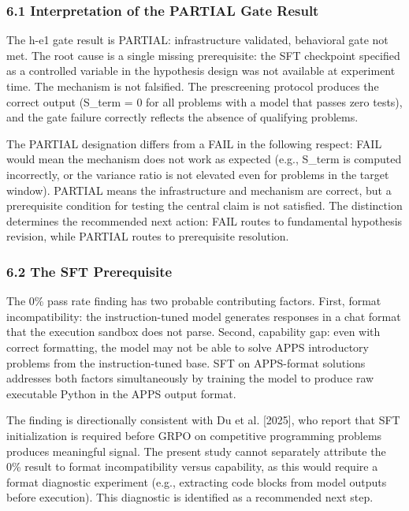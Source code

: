 
\subsubsection{6.1 Interpretation of the PARTIAL Gate Result}

The h-e1 gate result is PARTIAL: infrastructure validated, behavioral gate not met. The root cause is a single missing prerequisite: the SFT checkpoint specified as a controlled variable in the hypothesis design was not available at experiment time. The mechanism is not falsified. The prescreening protocol produces the correct output (S\_term = 0 for all problems with a model that passes zero tests), and the gate failure correctly reflects the absence of qualifying problems.

The PARTIAL designation differs from a FAIL in the following respect: FAIL would mean the mechanism does not work as expected (e.g., S\_term is computed incorrectly, or the variance ratio is not elevated even for problems in the target window). PARTIAL means the infrastructure and mechanism are correct, but a prerequisite condition for testing the central claim is not satisfied. The distinction determines the recommended next action: FAIL routes to fundamental hypothesis revision, while PARTIAL routes to prerequisite resolution.

\subsubsection{6.2 The SFT Prerequisite}

The 0\% pass rate finding has two probable contributing factors. First, format incompatibility: the instruction-tuned model generates responses in a chat format that the execution sandbox does not parse. Second, capability gap: even with correct formatting, the model may not be able to solve APPS introductory problems from the instruction-tuned base. SFT on APPS-format solutions addresses both factors simultaneously by training the model to produce raw executable Python in the APPS output format.

The finding is directionally consistent with Du et al. [2025], who report that SFT initialization is required before GRPO on competitive programming problems produces meaningful signal. The present study cannot separately attribute the 0\% result to format incompatibility versus capability, as this would require a format diagnostic experiment (e.g., extracting code blocks from model outputs before execution). This diagnostic is identified as a recommended next step.

